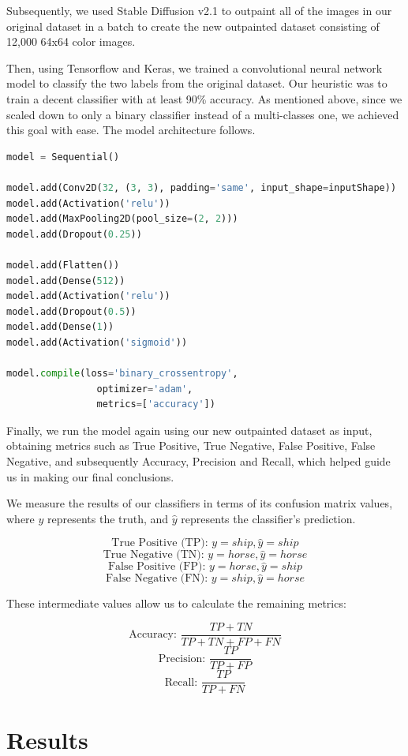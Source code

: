 \documentclass[conference]{IEEEtran}
\begin{document}
Subsequently, we used Stable Diffusion v2.1 to outpaint all of the images in our original dataset in a batch to create the new outpainted dataset consisting of 12,000 64x64 color images.

Then, using Tensorflow and Keras, we trained a convolutional neural network model to classify the two labels from the original dataset. Our heuristic was to train a decent classifier with at least 90\% accuracy. As mentioned above, since we scaled down to only a binary classifier instead of a multi-classes one, we achieved this goal with ease. The model architecture follows.

\begin{lstlisting}[language=Python, basicstyle=\small]
model = Sequential()

model.add(Conv2D(32, (3, 3), padding='same', input_shape=inputShape))
model.add(Activation('relu'))
model.add(MaxPooling2D(pool_size=(2, 2)))
model.add(Dropout(0.25))

model.add(Flatten())
model.add(Dense(512))
model.add(Activation('relu'))
model.add(Dropout(0.5))
model.add(Dense(1))
model.add(Activation('sigmoid'))

model.compile(loss='binary_crossentropy',
                optimizer='adam',
                metrics=['accuracy'])
\end{lstlisting}

Finally, we run the model again using our new outpainted dataset as input, obtaining metrics such as True Positive, True Negative, False Positive, False Negative, and subsequently Accuracy, Precision and Recall, which helped guide us in making our final conclusions.

We measure the results of our classifiers in terms of its confusion matrix values, where $y$ represents the truth, and $\hat{y}$ represents the classifier's prediction.

$$
\text{True Positive (TP): }y = ship, \hat{y} = ship
$$
$$
\text{True Negative (TN): }y = horse, \hat{y} = horse
$$
$$
\text{False Positive (FP): }y = horse, \hat{y} = ship
$$
$$
\text{False Negative (FN): }y = ship, \hat{y} = horse
$$

These intermediate values allow us to calculate the remaining metrics:

$$
\text{Accuracy: }\frac{TP + TN}{TP + TN + FP + FN}
$$
$$
\text{Precision: }\frac{TP}{TP + FP}
$$
$$
\text{Recall: }\frac{TP}{TP + FN}
$$

\section{Results}
\end{document}
